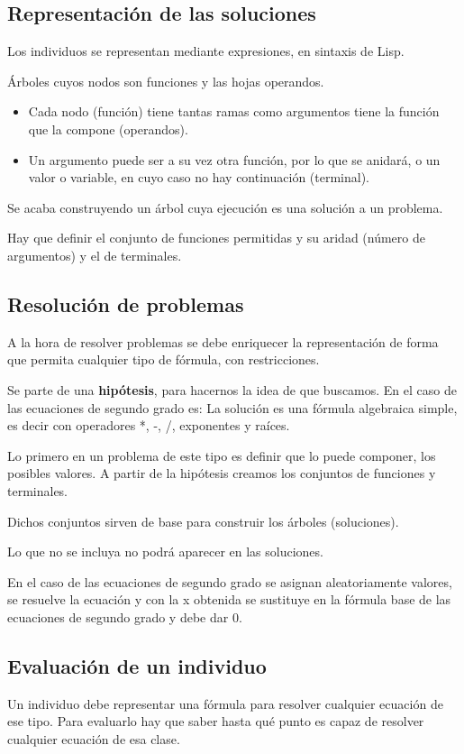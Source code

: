 \documentclass[12pt, twoside, openright]{report} %
\begin{document}
\subsection{Representación de las soluciones}
Los individuos se representan mediante expresiones, en sintaxis de Lisp.

Árboles cuyos nodos son funciones y las hojas operandos.
\begin{itemize}
	\item Cada nodo (función) tiene tantas ramas como argumentos tiene la función que la compone (operandos).
	\item Un argumento puede ser a su vez otra función, por lo que se anidará, o un valor o variable, en cuyo caso no hay continuación (terminal).
\end{itemize}
Se acaba construyendo un árbol cuya ejecución es una solución a un problema.

Hay que definir el conjunto de funciones permitidas y su aridad (número de argumentos) y el de terminales.

\subsection{Resolución de problemas}
A la hora de resolver problemas se debe enriquecer la representación de forma que permita cualquier tipo de fórmula, con restricciones.

Se parte de una \textbf{hipótesis}, para hacernos la idea de que buscamos. En el caso de las ecuaciones de segundo grado es: La solución es una fórmula algebraica simple, es decir con operadores *, -, /, exponentes y raíces.

Lo primero en un problema de este tipo es definir que lo puede componer, los posibles valores. A partir de la hipótesis creamos los conjuntos de funciones y terminales. 

Dichos conjuntos sirven de base para construir los árboles (soluciones).

Lo que no se incluya no podrá aparecer en las soluciones.

En  el caso de las ecuaciones de segundo grado se asignan aleatoriamente valores, se resuelve la ecuación y con la x obtenida se sustituye en la fórmula base de las ecuaciones de segundo grado y debe dar 0.

\subsection{Evaluación de un individuo}
Un individuo debe representar una fórmula para resolver cualquier ecuación de ese tipo. Para evaluarlo hay que saber hasta qué punto es capaz de resolver cualquier ecuación de esa clase.
\end{document}
